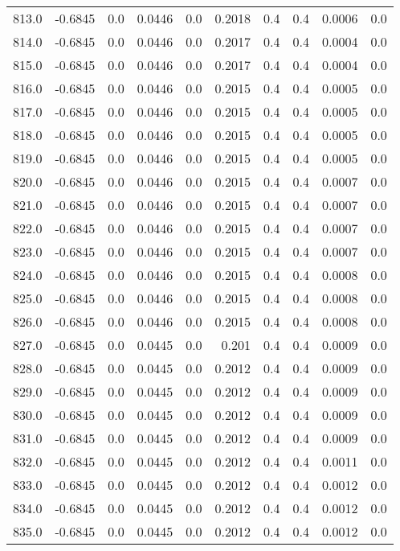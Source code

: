 \begin{longtable}{lrrrrrrrrr}
813.0 & -0.6845 & 0.0 & 0.0446 & 0.0 & 0.2018 & 0.4 & 0.4 & 0.0006 & 0.0 \\
814.0 & -0.6845 & 0.0 & 0.0446 & 0.0 & 0.2017 & 0.4 & 0.4 & 0.0004 & 0.0 \\
815.0 & -0.6845 & 0.0 & 0.0446 & 0.0 & 0.2017 & 0.4 & 0.4 & 0.0004 & 0.0 \\
816.0 & -0.6845 & 0.0 & 0.0446 & 0.0 & 0.2015 & 0.4 & 0.4 & 0.0005 & 0.0 \\
817.0 & -0.6845 & 0.0 & 0.0446 & 0.0 & 0.2015 & 0.4 & 0.4 & 0.0005 & 0.0 \\
818.0 & -0.6845 & 0.0 & 0.0446 & 0.0 & 0.2015 & 0.4 & 0.4 & 0.0005 & 0.0 \\
819.0 & -0.6845 & 0.0 & 0.0446 & 0.0 & 0.2015 & 0.4 & 0.4 & 0.0005 & 0.0 \\
820.0 & -0.6845 & 0.0 & 0.0446 & 0.0 & 0.2015 & 0.4 & 0.4 & 0.0007 & 0.0 \\
821.0 & -0.6845 & 0.0 & 0.0446 & 0.0 & 0.2015 & 0.4 & 0.4 & 0.0007 & 0.0 \\
822.0 & -0.6845 & 0.0 & 0.0446 & 0.0 & 0.2015 & 0.4 & 0.4 & 0.0007 & 0.0 \\
823.0 & -0.6845 & 0.0 & 0.0446 & 0.0 & 0.2015 & 0.4 & 0.4 & 0.0007 & 0.0 \\
824.0 & -0.6845 & 0.0 & 0.0446 & 0.0 & 0.2015 & 0.4 & 0.4 & 0.0008 & 0.0 \\
825.0 & -0.6845 & 0.0 & 0.0446 & 0.0 & 0.2015 & 0.4 & 0.4 & 0.0008 & 0.0 \\
826.0 & -0.6845 & 0.0 & 0.0446 & 0.0 & 0.2015 & 0.4 & 0.4 & 0.0008 & 0.0 \\
827.0 & -0.6845 & 0.0 & 0.0445 & 0.0 & 0.201 & 0.4 & 0.4 & 0.0009 & 0.0 \\
828.0 & -0.6845 & 0.0 & 0.0445 & 0.0 & 0.2012 & 0.4 & 0.4 & 0.0009 & 0.0 \\
829.0 & -0.6845 & 0.0 & 0.0445 & 0.0 & 0.2012 & 0.4 & 0.4 & 0.0009 & 0.0 \\
830.0 & -0.6845 & 0.0 & 0.0445 & 0.0 & 0.2012 & 0.4 & 0.4 & 0.0009 & 0.0 \\
831.0 & -0.6845 & 0.0 & 0.0445 & 0.0 & 0.2012 & 0.4 & 0.4 & 0.0009 & 0.0 \\
832.0 & -0.6845 & 0.0 & 0.0445 & 0.0 & 0.2012 & 0.4 & 0.4 & 0.0011 & 0.0 \\
833.0 & -0.6845 & 0.0 & 0.0445 & 0.0 & 0.2012 & 0.4 & 0.4 & 0.0012 & 0.0 \\
834.0 & -0.6845 & 0.0 & 0.0445 & 0.0 & 0.2012 & 0.4 & 0.4 & 0.0012 & 0.0 \\
835.0 & -0.6845 & 0.0 & 0.0445 & 0.0 & 0.2012 & 0.4 & 0.4 & 0.0012 & 0.0 \\

\end{longtable}
